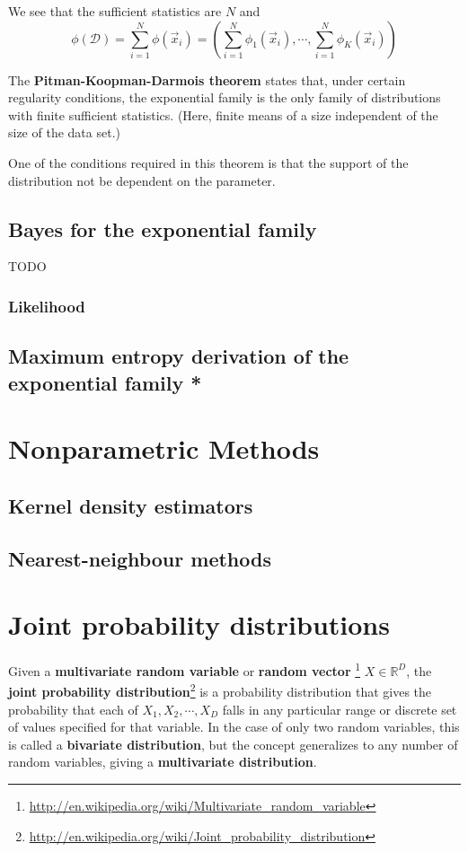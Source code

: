 We see that the sufficient statistics are $N$ and
\begin{equation}
\phi(\mathcal{D})=\sum\limits_{i=1}^N \phi(\vec{x}_i)=(\sum\limits_{i=1}^N \phi_1(\vec{x}_i),\cdots,\sum\limits_{i=1}^N \phi_K(\vec{x}_i))
\end{equation}

The \textbf{Pitman-Koopman-Darmois theorem} states that, under certain regularity conditions, the exponential family is the only family of distributions with finite sufficient statistics. (Here, finite means of a size independent of the size of the data set.)

One of the conditions required in this theorem is that the support of the distribution not be dependent on the parameter.


\subsection{Bayes for the exponential family}
\label{sec:Bayes-for-the-exponential-family}
TODO


\subsubsection{Likelihood}



\subsection{Maximum entropy derivation of the exponential family *}
\label{sec:Maximum-entropy-derivation-of-the-exponential-family}


\section{Nonparametric Methods}
\subsection{Kernel density estimators}
\subsection{Nearest-neighbour methods}


\section{Joint probability distributions}
Given a \textbf{multivariate random variable} or \textbf{random vector} \footnote{\url{http://en.wikipedia.org/wiki/Multivariate_random_variable}} $X \in \mathbb{R}^D$, the \textbf{joint probability distribution}\footnote{\url{http://en.wikipedia.org/wiki/Joint_probability_distribution}} is a probability distribution that gives the probability that each of $X_1, X_2, \cdots,X_D$ falls in any particular range or discrete set of values specified for that variable. In the case of only two random variables, this is called a \textbf{bivariate distribution}, but the concept generalizes to any number of random variables, giving a \textbf{multivariate distribution}.

